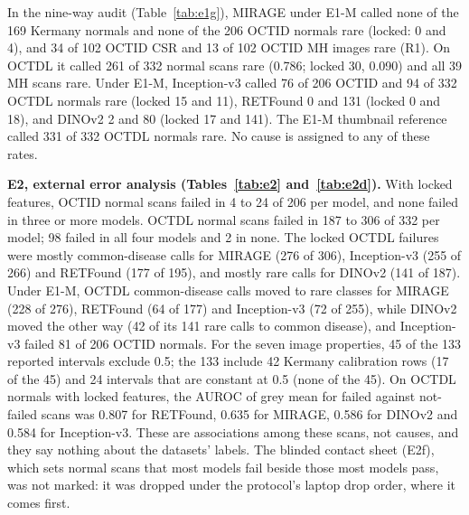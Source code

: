 \documentclass[conference]{IEEEtran}
\begin{document}
In the nine-way audit (Table~\ref{tab:e1g}), MIRAGE under E1-M called none of the 169 Kermany normals and none of the 206 OCTID normals rare (locked: 0 and 4), and 34 of 102 OCTID CSR and 13 of 102 OCTID MH images rare (R1). On OCTDL it called 261 of 332 normal scans rare (0.786; locked 30, 0.090) and all 39 MH scans rare. Under E1-M, Inception-v3 called 76 of 206 OCTID and 94 of 332 OCTDL normals rare (locked 15 and 11), RETFound 0 and 131 (locked 0 and 18), and DINOv2 2 and 80 (locked 17 and 141). The E1-M thumbnail reference called 331 of 332 OCTDL normals rare. No cause is assigned to any of these rates.

\textbf{E2, external error analysis (Tables~\ref{tab:e2} and~\ref{tab:e2d}).} With locked features, OCTID normal scans failed in 4 to 24 of 206 per model, and none failed in three or more models. OCTDL normal scans failed in 187 to 306 of 332 per model; 98 failed in all four models and 2 in none. The locked OCTDL failures were mostly common-disease calls for MIRAGE (276 of 306), Inception-v3 (255 of 266) and RETFound (177 of 195), and mostly rare calls for DINOv2 (141 of 187). Under E1-M, OCTDL common-disease calls moved to rare classes for MIRAGE (228 of 276), RETFound (64 of 177) and Inception-v3 (72 of 255), while DINOv2 moved the other way (42 of its 141 rare calls to common disease), and Inception-v3 failed 81 of 206 OCTID normals. For the seven image properties, 45 of the 133 reported intervals exclude 0.5; the 133 include 42 Kermany calibration rows (17 of the 45) and 24 intervals that are constant at 0.5 (none of the 45). On OCTDL normals with locked features, the AUROC of grey mean for failed against not-failed scans was 0.807 for RETFound, 0.635 for MIRAGE, 0.586 for DINOv2 and 0.584 for Inception-v3. These are associations among these scans, not causes, and they say nothing about the datasets' labels. The blinded contact sheet (E2f), which sets normal scans that most models fail beside those most models pass, was not marked: it was dropped under the protocol's laptop drop order, where it comes first.
\end{document}
